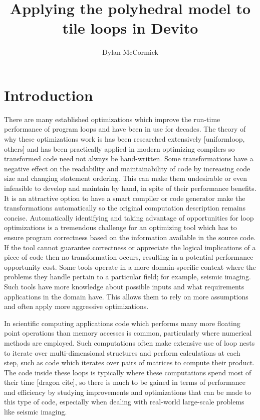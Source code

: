 \documentclass[a4paper,12pt,twoside]{report}
\title{Applying the polyhedral model to tile loops in Devito}
\author{Dylan McCormick}
\begin{document}
\maketitle

\tableofcontents

\chapter{Introduction} %
There are many established optimizations which improve the run-time performance of program loops and have been in use for decades.
The theory of why these optimizations work is has been researched extensively [uniformloop, others] and has been practically applied in modern optimizing compilers so
transformed code need not always be hand-written. Some transformations have a negative effect on the readability and maintainability of code by
increasing code size and changing statement ordering. This can make them undesirable or even infeasible to develop and maintain by hand, in spite
of their performance benefits. It is an attractive option to have a smart compiler or code generator make the transformations automatically so the
original computation description remains concise. Automatically identifying and taking advantage of opportunities for loop optimizations is a tremendous
challenge for an optimizing tool which has to ensure program correctness based on the information available in the source code. If the tool cannot guarantee
correctness or appreciate the logical implications of a piece of code then no transformation occurs, resulting in a potential performance opportunity cost.
Some tools operate in a more domain-specific context where the problems they handle pertain to a particular field; for example, seismic imaging.
Such tools have more knowledge about possible inputs and what requirements applications in the domain have. This allows them to rely on more
assumptions and often apply more aggressive optimizations.

In scientific computing applications code which performs many more floating point operations than memory accesses is common, particularly 
where numerical methods are employed. Such computations often make extensive use of loop nests to iterate over multi-dimensional structures and perform calculations
at each step, such as code which iterates over pairs of matrices to compute their product. The code inside these loops is typically where these computations 
spend most of their time [dragon cite], so there is much to be gained in terms of performance and efficiency by studying improvements and optimizations that 
can be made to this type of code, especially when dealing with real-world large-scale problems like seismic imaging.
\end{document}
